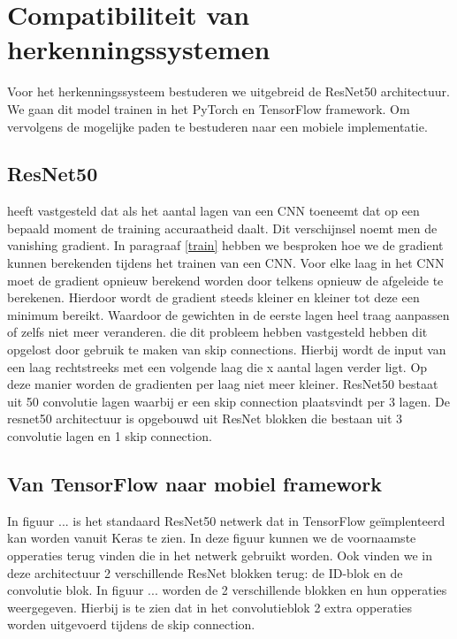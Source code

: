 \chapter{Compatibiliteit van herkenningssystemen}
Voor het herkenningssysteem bestuderen we uitgebreid de ResNet50 architectuur.
We gaan dit model trainen in het PyTorch en TensorFlow framework.
Om vervolgens de mogelijke paden te bestuderen naar een mobiele implementatie.

\section{ResNet50}
\cite{he2015deep} heeft vastgesteld dat als het aantal lagen van een CNN toeneemt dat op een bepaald moment de training accuraatheid daalt.
Dit verschijnsel noemt men de vanishing gradient.
In paragraaf \ref{train} hebben we besproken hoe we de gradient kunnen berekenden tijdens het trainen van een CNN.
Voor elke laag in het CNN moet de gradient opnieuw berekend worden door telkens opnieuw de afgeleide te berekenen.
Hierdoor wordt de gradient steeds kleiner en kleiner tot deze een minimum bereikt.
Waardoor de gewichten in de eerste lagen heel traag aanpassen of zelfs niet meer veranderen.
\cite{he2015deep} die dit probleem hebben vastgesteld hebben dit opgelost door gebruik te maken van skip connections.
Hierbij wordt de input van een laag rechtstreeks met een volgende laag die x aantal lagen verder ligt.
Op deze manier worden de gradienten per laag niet meer kleiner.
ResNet50 bestaat uit 50 convolutie lagen waarbij er een skip connection plaatsvindt per 3 lagen.
De resnet50 architectuur is opgebouwd uit ResNet blokken die bestaan uit 3 convolutie lagen en 1 skip connection.


\section{Van TensorFlow naar mobiel framework}
In figuur ... is het standaard ResNet50 netwerk dat in TensorFlow ge\"implenteerd kan worden vanuit Keras te zien.
In deze figuur kunnen we de voornaamste opperaties terug vinden die in het netwerk gebruikt worden.
Ook vinden we in deze architectuur 2 verschillende ResNet blokken terug: de ID-blok en de convolutie blok.
In figuur ... worden de 2 verschillende blokken en hun opperaties weergegeven.
Hierbij is te zien dat in het convolutieblok 2 extra opperaties worden uitgevoerd tijdens de skip connection.

